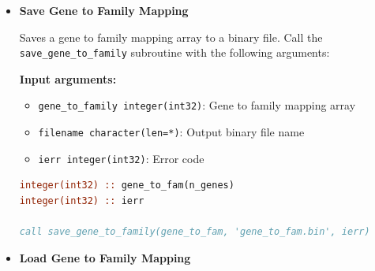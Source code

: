 \begin{enumerate}
\begin{itemize}
\begin{itemize}
                    \item \texttt{ierr integer(int32)}: Error code
                  \end{itemize}
                  \textbf{Output arguments:}
                  \begin{itemize}
                    \item \texttt{expression real(real64), allocatable}: Loaded expression
                          data matrix
                  \end{itemize}
                  \begin{lstlisting}[language=Fortran, caption={Load Expression Data}]
real(real64), allocatable :: loaded_expr(:,:)
integer(int32) :: ierr

call load_expression_vectors(loaded_expr, 'expression.bin', ierr)
! loaded_expr automatically allocated as (samples x genes)
                  \end{lstlisting}
                  
            \item \textbf{Save Gene to Family Mapping}
                  
                  Saves a gene to family mapping array to a binary file. Call the
                  \texttt{save\_gene\_to\_family} subroutine with the following arguments:
                  
                  \textbf{Input arguments:}
                  \begin{itemize}
                    \item \texttt{gene\_to\_family integer(int32)}: Gene to family mapping
                          array
                          
                    \item \texttt{filename character(len=*)}: Output binary file name
                          
                    \item \texttt{ierr integer(int32)}: Error code
                  \end{itemize}
                  \begin{lstlisting}[language=Fortran, caption={Save Gene-Family Mapping}]
integer(int32) :: gene_to_fam(n_genes)
integer(int32) :: ierr

call save_gene_to_family(gene_to_fam, 'gene_to_fam.bin', ierr)
                  \end{lstlisting}
                  
            \item \textbf{Load Gene to Family Mapping}
                  

\end{itemize}
\end{enumerate}
